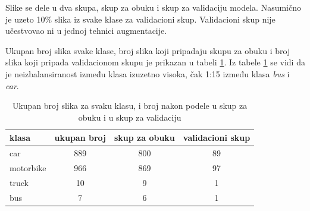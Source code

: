 \documentclass[12pt,oneside]{memoir}
\begin{document}
Slike se dele u dva skupa, skup za obuku i skup za validaciju modela. Nasumično je uzeto 10\% slika iz svake klase za validacioni skup. Validacioni skup nije učestvovao ni u jednoj tehnici augmentacije. 

Ukupan broj slika svake klase, broj slika koji pripadaju skupu za obuku i broj slika koji pripada validacionom skupu je prikazan u tabeli \ref{tab:section4_dostpunipodaci}. Iz tabele \ref{tab:section4_dostpunipodaci} se vidi da je neizbalansiranost između klasa izuzetno visoka, čak 1:15 između klasa \textit{bus} i \textit{car}.

\begin{table}
    \begin{center}
    \caption{Ukupan broj slika za svaku klasu, i broj nakon podele u skup za obuku i u skup za validaciju }\label{tab:section4_dostpunipodaci}
    \begin{tabular}{l|c|c|c}
    klasa & ukupan broj & skup za obuku & validacioni skup\\ 
    \hline
    car & 889 & 800 & 89 \\
    motorbike & 966 & 869 & 97 \\
    truck & 10 & 9 & 1 \\
    bus & 7 & 6 & 1 \\
    \end{tabular}
    \end{center}
\end{table}
\end{document}
